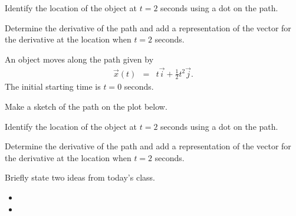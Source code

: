 \begin{problem}
\begin{subproblem}
    \scalebox{0.7}{}

  \item Identify the location of the object at $t=2$ seconds using a
    dot on the path.
  \item Determine the derivative of the path and add a representation
    of the vector for the derivative at the location when $t=2$
    seconds.  
    \vspace{5em}
  \end{subproblem}

  \clearpage

\item An object moves along the path given by
  \begin{eqnarray*}
    \vec{x}(t) & = & t \vec{i} + \frac{1}{2} t^2 \vec{j}.
  \end{eqnarray*}
  The initial starting time is $t=0$ seconds.

  \begin{subproblem}
  \item Make a sketch of the path on the plot below.

    \scalebox{0.7}{}

  \item Identify the location of the object at $t=2$ seconds using a
    dot on the path.
  \item Determine the derivative of the path and add a representation
    of the vector for the derivative at the location when $t=2$
    seconds.  
    \vspace{5em}
  \end{subproblem}

\end{problem}

\postClass

\begin{problem}
\item Briefly state two ideas from today's class.
  \begin{itemize}
  \item 
  \item 
  \end{itemize}
\item 
  \begin{subproblem}
    \item
  \end{subproblem}
\end{problem}


